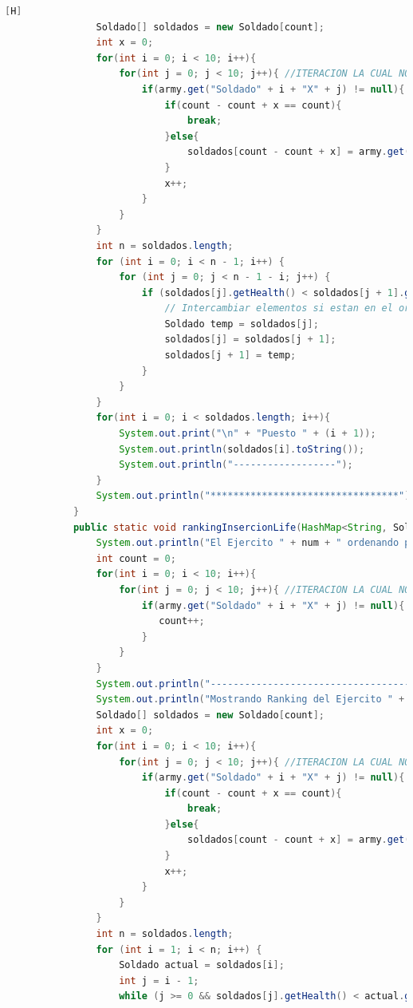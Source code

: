 \documentclass{article}
\begin{document}
\begin{lstlisting}[language=java,caption={Las lineas de codigos del metodo creado:}][H]
				Soldado[] soldados = new Soldado[count];
				int x = 0;
				for(int i = 0; i < 10; i++){
					for(int j = 0; j < 10; j++){ //ITERACION LA CUAL NOS AYUDA A PASAR POR TODOS LOS SOLDADOS AL ARRAY SOLDADO PARA PODER USAR EL USO DEL METODO DE ORDENACION BURBUJA
						if(army.get("Soldado" + i + "X" + j) != null){ 
							if(count - count + x == count){
								break;
							}else{
								soldados[count - count + x] = army.get("Soldado" + i + "X" + j);
							}
							x++;   
						}
					}
				}
				int n = soldados.length;
				for (int i = 0; i < n - 1; i++) {
					for (int j = 0; j < n - 1 - i; j++) {
						if (soldados[j].getHealth() < soldados[j + 1].getHealth()) {
							// Intercambiar elementos si estan en el orden incorrecto
							Soldado temp = soldados[j];
							soldados[j] = soldados[j + 1];
							soldados[j + 1] = temp;
						}
					}
				}
				for(int i = 0; i < soldados.length; i++){
					System.out.print("\n" + "Puesto " + (i + 1));
					System.out.println(soldados[i].toString());
					System.out.println("------------------");
				}
				System.out.println("*********************************");
			}
			public static void rankingInsercionLife(HashMap<String, Soldado> army , int num){
				System.out.println("El Ejercito " + num + " ordenando por metodo insercion: ");
				int count = 0;
				for(int i = 0; i < 10; i++){
					for(int j = 0; j < 10; j++){ //ITERACION LA CUAL NOS AYUDA A PASAR POR TODOS LOS SOLDADOS DE CADA EJERCITO
						if(army.get("Soldado" + i + "X" + j) != null){ 
						   count++;
						}
					}
				}
				System.out.println("------------------------------------------");
				System.out.println("Mostrando Ranking del Ejercito " + num + " ..... ////// --->");
				Soldado[] soldados = new Soldado[count];
				int x = 0;
				for(int i = 0; i < 10; i++){
					for(int j = 0; j < 10; j++){ //ITERACION LA CUAL NOS AYUDA A PASAR POR TODOS LOS SOLDADOS AL ARRAY SOLDADO PARA PODER USAR EL USO DEL METODO DE ORDENACION INSERCION
						if(army.get("Soldado" + i + "X" + j) != null){ 
							if(count - count + x == count){
								break;
							}else{
								soldados[count - count + x] = army.get("Soldado" + i + "X" + j); //LA MISMA LOGICA QUE EL ANTERIOR METODO SOLO QUE EN ESTE LO USARIAMOS DE MANERA DIFERENTE YA QUE ESTE SERIA DE FORMA DE INSERCION
							}
							x++;   
						}
					}
				}
				int n = soldados.length;
				for (int i = 1; i < n; i++) {
					Soldado actual = soldados[i];
					int j = i - 1;
					while (j >= 0 && soldados[j].getHealth() < actual.getHealth()) { //ORDENAMOS EL EJERCITO RESPECTIVAMENTE MEDIANTE EL METODO QUE NOS OFRECE INSERCION EL CUAL ES ESTE CODIGO

\end{lstlisting}
\end{document}
